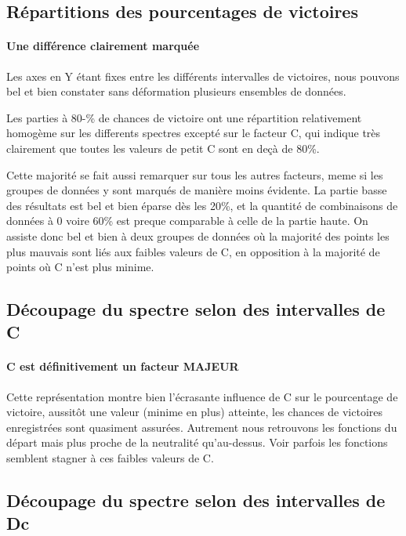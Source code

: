 \subsection{Répartitions des pourcentages de victoires}

\paragraph{Une différence clairement marquée}
Les axes en Y étant fixes entre les différents intervalles de victoires, nous pouvons bel et bien constater sans déformation plusieurs ensembles de données.

Les parties à 80-\% de chances de victoire ont une répartition relativement homogème sur les differents spectres excepté sur le facteur C, qui indique très clairement que toutes les valeurs de petit C sont en deçà de 80\%.

Cette majorité se fait aussi remarquer sur tous les autres facteurs, meme si les groupes de données y sont marqués de manière moins évidente.
La partie basse des résultats est bel et bien éparse dès les 20\%, et la quantité de combinaisons de données à 0 voire 60\% est preque comparable à celle de la partie haute. 
On assiste donc bel et bien à deux groupes de données où la majorité des points les plus mauvais sont liés aux faibles valeurs de C, en opposition à la majorité de points où C n'est plus minime.



\subsection{Découpage du spectre selon des intervalles de C}
\paragraph{C est définitivement un facteur MAJEUR}
Cette représentation montre bien l'écrasante influence de C sur le pourcentage de victoire, aussitôt une valeur (minime en plus) atteinte, les chances de victoires enregistrées sont quasiment assurées.
Autrement nous retrouvons les fonctions du départ mais plus proche de la neutralité qu'au-dessus.
Voir parfois les fonctions semblent stagner à ces faibles valeurs de C.




\subsection{Découpage du spectre selon des intervalles de Dc}
